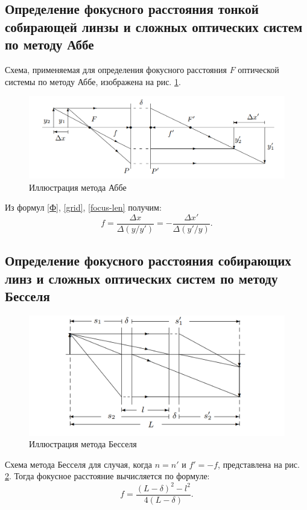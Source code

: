 \documentclass[a4paper, 12pt]{article}%
\newcommand{\picref}[1]{рис. \ref{#1}}
\begin{document}
	
	
	
	
	\subsection{Определение фокусного расстояния тонкой собирающей линзы и сложных оптических систем по методу Аббе}
	
	Схема, применяемая для определения фокусного расстояния $ F $ оптической системы по методу Аббе, изображена на \picref{1}.
	\begin{figure}[tbp]
		\centering
		\includegraphics[width=0.8\linewidth]{Screenshot_3}
		\caption{Иллюстрация метода Аббе}
		\label{1}
	\end{figure}
	
	Из формул \eqref{Ф}, \eqref{grid}, \eqref{focus-len} получим:
	\begin{equation}\label{abbe}
		f = \frac{\Delta x}{\Delta (y/y')} = -\frac{\Delta x'}{\Delta (y'/y)}.
	\end{equation}
	
	\subsection{Определение фокусного расстояния собирающих линз и сложных оптических систем по методу Бесселя}
	
	\begin{figure}[tbp]
		\centering
		\includegraphics[width=0.8\linewidth]{Screenshot_2}
		\caption{Иллюстрация метода Бесселя}
		\label{3}
	\end{figure}
	Схема метода Бесселя для случая, когда $n = n'$ и $f' = -f$, представлена на \picref{3}. Тогда фокусное расстояние вычисляется по формуле:
	\begin{equation}\label{Bessel}
		f = \frac{(L - \delta)^2 - l^2}{4(L-\delta)}.
	\end{equation}
	
\end{document}
